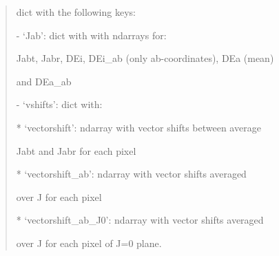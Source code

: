 \documentclass[letterpaper,10pt,english]{sphinxmanual}
\begin{document}
\begin{fulllineitems}
\begin{description}
\begin{quote}
\begin{description}
\end{description}\end{quote}

\item[{Returns:}] \leavevmode\begin{quote}\begin{description}
\item[{returns}] \leavevmode
\begin{DUlineblock}{0em}
\item[] dict with the following keys:
\item[]
\begin{DUlineblock}{\DUlineblockindent}
\item[]
\begin{DUlineblock}{\DUlineblockindent}
\item[] - ‘Jab’: dict with with ndarrays for:
\item[]
\begin{DUlineblock}{\DUlineblockindent}
\item[] Jabt, Jabr, DEi, DEi\_ab (only ab-coordinates), DEa (mean) 
\item[]
\begin{DUlineblock}{\DUlineblockindent}
\item[] and DEa\_ab
\end{DUlineblock}
\end{DUlineblock}
\item[] - ‘vshifts’: dict with:
\item[]
\begin{DUlineblock}{\DUlineblockindent}
\item[] * ‘vectorshift’: ndarray with vector shifts between average
\item[]
\begin{DUlineblock}{\DUlineblockindent}
\item[] Jabt and Jabr for each pixel
\end{DUlineblock}
\item[] * ‘vectorshift\_ab’: ndarray with vector shifts averaged 
\item[]
\begin{DUlineblock}{\DUlineblockindent}
\item[] over J for each pixel
\end{DUlineblock}
\item[] * ‘vectorshift\_ab\_J0’: ndarray with vector shifts averaged 
\item[]
\begin{DUlineblock}{\DUlineblockindent}
\item[] over J for each pixel of J=0 plane.

\end{DUlineblock}
\end{DUlineblock}
\end{DUlineblock}
\end{DUlineblock}
\end{DUlineblock}
\end{description}
\end{quote}
\end{description}
\end{fulllineitems}
\end{document}
